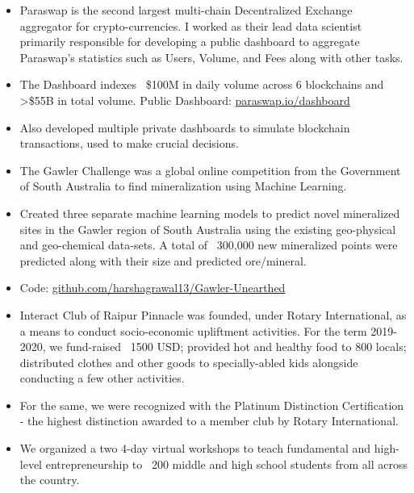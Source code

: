 \documentclass[10pt,a4paper,ragged2e]{altacv}
\begin{document}
\begin{itemize}
    \item {Paraswap is the second largest multi-chain Decentralized Exchange aggregator for crypto-currencies. I worked as their lead data scientist primarily responsible for developing a public dashboard to aggregate Paraswap's statistics such as Users, Volume, and Fees along with other tasks.}
    \item {The Dashboard indexes ~\$100M in daily volume across 6 blockchains and >\$55B in total volume. Public Dashboard: \href{https://www.paraswap.io/dashboard}{paraswap.io/dashboard}}
    \item {Also developed multiple private dashboards to simulate blockchain transactions, used to make crucial decisions.}
\end{itemize}
\divider
{}
\begin{itemize}
    \item The Gawler Challenge was a global online competition from the Government of South Australia to find mineralization using Machine Learning.
    \item Created three separate machine learning models to predict novel mineralized sites in the Gawler region of South Australia using the existing geo-physical and geo-chemical data-sets. A total of ~300,000 new mineralized points were predicted along with their size and predicted ore/mineral.
    \item Code: \href{https://github.com/harshagrawal13/Gawler-Unearthed}{github.com/harshagrawal13/Gawler-Unearthed}
\end{itemize}
\divider
{}
\begin{itemize}
    \item {Interact Club of Raipur Pinnacle was founded, under Rotary International, as a means to conduct socio-economic upliftment activities. For the term 2019-2020, we fund-raised ~1500 USD; provided hot and healthy food to 800 locals; distributed clothes and other goods to specially-abled kids alongside conducting a few other activities.}
    \item {For the same, we were recognized with the Platinum Distinction Certification - the highest distinction awarded to a member club by Rotary International.}
\end{itemize}
\divider

\begin{itemize}
    \item We organized a two 4-day virtual workshops to teach fundamental and high-level entrepreneurship to ~200 middle and high school students from all across the country.
\end{itemize}

\clearpage
\end{document}

